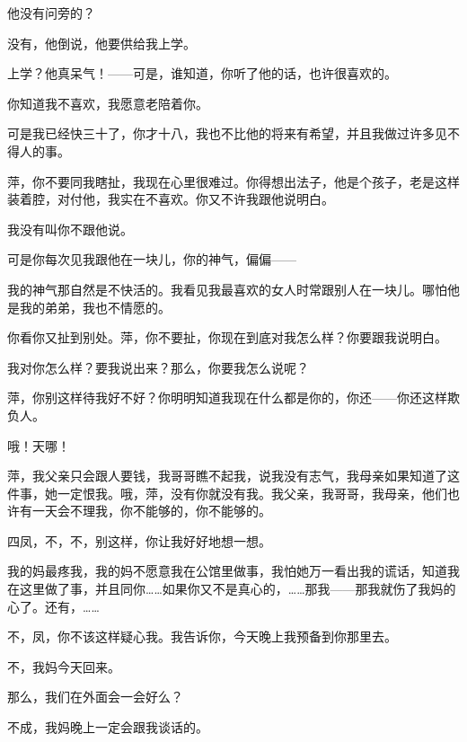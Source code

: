 他没有问旁的？

没有，他倒说，他要供给我上学。

上学？他真呆气！——可是，谁知道，你听了他的话，也许很喜欢的。

你知道我不喜欢，我愿意老陪着你。

可是我已经快三十了，你才十八，我也不比他的将来有希望，并且我做过许多见不得人的事。

萍，你不要同我瞎扯，我现在心里很难过。你得想出法子，他是个孩子，老是这样装着腔，对付他，我实在不喜欢。你又不许我跟他说明白。

我没有叫你不跟他说。

可是你每次见我跟他在一块儿，你的神气，偏偏——

我的神气那自然是不快活的。我看见我最喜欢的女人时常跟别人在一块儿。哪怕他是我的弟弟，我也不情愿的。

你看你又扯到别处。萍，你不要扯，你现在到底对我怎么样？你要跟我说明白。

我对你怎么样？要我说出来？那么，你要我怎么说呢？

萍，你别这样待我好不好？你明明知道我现在什么都是你的，你还——你还这样欺负人。

哦！天哪！

萍，我父亲只会跟人要钱，我哥哥瞧不起我，说我没有志气，我母亲如果知道了这件事，她一定恨我。哦，萍，没有你就没有我。我父亲，我哥哥，我母亲，他们也许有一天会不理我，你不能够的，你不能够的。

四凤，不，不，别这样，你让我好好地想一想。

我的妈最疼我，我的妈不愿意我在公馆里做事，我怕她万一看出我的谎话，知道我在这里做了事，并且同你……如果你又不是真心的，……那我——那我就伤了我妈的心了。还有，……

不，凤，你不该这样疑心我。我告诉你，今天晚上我预备到你那里去。

不，我妈今天回来。

那么，我们在外面会一会好么？

不成，我妈晚上一定会跟我谈话的。


